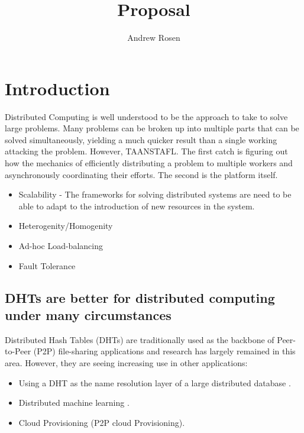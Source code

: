 \documentclass[10pt,letterpaper]{report}
\title{Proposal}
\author{Andrew Rosen}
\begin{document}
\maketitle
\setcounter{tocdepth}{4}
\tableofcontents
\newpage
\chapter{Introduction}


Distributed Computing is well understood to be the approach to take to solve large problems.  
Many problems can be broken up into multiple parts that can be solved simultaneously, yielding a much quicker result than a single working attacking the problem.
However, TAANSTAFL.
The first catch is figuring out how the mechanics of efficiently distributing a problem to multiple workers and asynchronously coordinating their efforts.
The second is the platform itself.


\begin{itemize}
	\item Scalability - The frameworks for solving distributed systems are need to be able to adapt to the introduction of new resources in the system.
	\item Heterogenity/Homogenity
	\item Ad-hoc Load-balancing
    \item Fault Tolerance
\end{itemize}


\section{DHTs are better for distributed computing under many circumstances}
Distributed Hash Tables (DHTs) are traditionally used as the backbone of Peer-to-Peer (P2P) file-sharing applications and research has largely remained in this area.
However, they are seeing increasing use in other applications:

\begin{itemize}
    \item Using a DHT as the name resolution layer of a large distributed database \cite{Mateescu2011440}. %
    \item Distributed machine learning \cite{liparameter}.
    \item Cloud Provisioning  (P2P cloud Provisioning).
\end{itemize}
\end{document}
